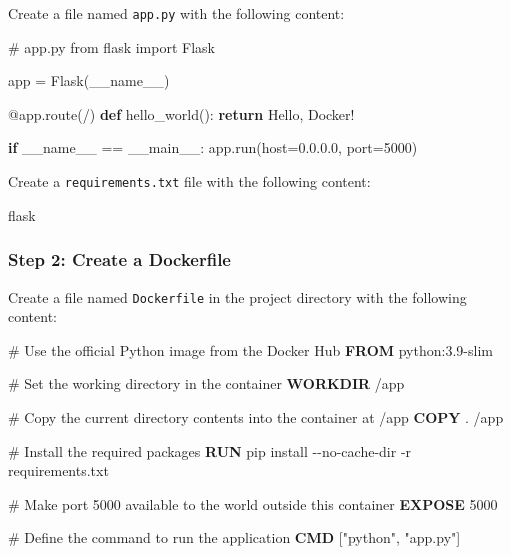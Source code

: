\documentclass[
  letterpaper,
  DIV=11,
  numbers=noendperiod]{scrreprt}
\newenvironment{Shaded}{\begin{snugshade}}{\end{snugshade}}
\newcommand{\AttributeTok}[1]{\textcolor[rgb]{0.40,0.45,0.13}{#1}}
\newcommand{\CommentTok}[1]{\textcolor[rgb]{0.37,0.37,0.37}{#1}}
\newcommand{\ControlFlowTok}[1]{\textcolor[rgb]{0.00,0.23,0.31}{\textbf{#1}}}
\newcommand{\DecValTok}[1]{\textcolor[rgb]{0.68,0.00,0.00}{#1}}
\newcommand{\ExtensionTok}[1]{\textcolor[rgb]{0.00,0.23,0.31}{#1}}
\newcommand{\ImportTok}[1]{\textcolor[rgb]{0.00,0.46,0.62}{#1}}
\newcommand{\KeywordTok}[1]{\textcolor[rgb]{0.00,0.23,0.31}{\textbf{#1}}}
\newcommand{\NormalTok}[1]{\textcolor[rgb]{0.00,0.23,0.31}{#1}}
\newcommand{\OperatorTok}[1]{\textcolor[rgb]{0.37,0.37,0.37}{#1}}
\newcommand{\StringTok}[1]{\textcolor[rgb]{0.13,0.47,0.30}{#1}}
\newcommand{\VariableTok}[1]{\textcolor[rgb]{0.07,0.07,0.07}{#1}}
\begin{document}
Create a file named \texttt{app.py} with the following content:

\begin{Shaded}
\begin{Highlighting}[]
\CommentTok{\# app.py}
\ImportTok{from}\NormalTok{ flask }\ImportTok{import}\NormalTok{ Flask}

\NormalTok{app }\OperatorTok{=}\NormalTok{ Flask(}\VariableTok{\_\_name\_\_}\NormalTok{)}

\AttributeTok{@app.route}\NormalTok{(}\StringTok{\textquotesingle{}/\textquotesingle{}}\NormalTok{)}
\KeywordTok{def}\NormalTok{ hello\_world():}
    \ControlFlowTok{return} \StringTok{\textquotesingle{}Hello, Docker!\textquotesingle{}}

\ControlFlowTok{if} \VariableTok{\_\_name\_\_} \OperatorTok{==} \StringTok{\textquotesingle{}\_\_main\_\_\textquotesingle{}}\NormalTok{:}
\NormalTok{    app.run(host}\OperatorTok{=}\StringTok{\textquotesingle{}0.0.0.0\textquotesingle{}}\NormalTok{, port}\OperatorTok{=}\DecValTok{5000}\NormalTok{)}
\end{Highlighting}
\end{Shaded}

Create a \texttt{requirements.txt} file with the following content:

\begin{Shaded}
\begin{Highlighting}[]
\NormalTok{flask}
\end{Highlighting}
\end{Shaded}

\subsubsection{Step 2: Create a
Dockerfile}\label{step-2-create-a-dockerfile}

Create a file named \texttt{Dockerfile} in the project directory with
the following content:

\begin{Shaded}
\begin{Highlighting}[]
\CommentTok{\# Use the official Python image from the Docker Hub}
\KeywordTok{FROM}\NormalTok{ python:3.9{-}slim}

\CommentTok{\# Set the working directory in the container}
\KeywordTok{WORKDIR}\NormalTok{ /app}

\CommentTok{\# Copy the current directory contents into the container at /app}
\KeywordTok{COPY}\NormalTok{ . /app}

\CommentTok{\# Install the required packages}
\KeywordTok{RUN} \ExtensionTok{pip}\NormalTok{ install }\AttributeTok{{-}{-}no{-}cache{-}dir} \AttributeTok{{-}r}\NormalTok{ requirements.txt}

\CommentTok{\# Make port 5000 available to the world outside this container}
\KeywordTok{EXPOSE}\NormalTok{ 5000}

\CommentTok{\# Define the command to run the application}
\KeywordTok{CMD}\NormalTok{ [}\StringTok{"python"}\NormalTok{, }\StringTok{"app.py"}\NormalTok{]}
\end{Highlighting}
\end{Shaded}
\end{document}
